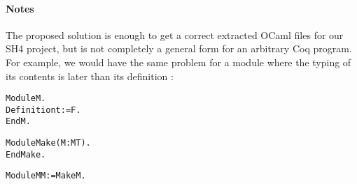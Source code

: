 \documentclass[a4paper, 11pt]{article}
\newenvironment{coq}
  {%
   \begin{alltt}
   \footnotesize} %% 8.3pl2 (April 2011)
  {\end{alltt} %
  }
\begin{document}
\paragraph{Notes}
The proposed solution is enough to get a correct extracted OCaml files for our SH4 project, but is not completely a general form for an arbitrary Coq program. For example, we would have the same problem for a module where the typing of its contents is later than its definition :
\begin{coq}
Module M.
  Definition t := F.
End M.

Module Make (M : MT).
End Make.

Module MM := Make M.
\end{coq}
\end{document}
